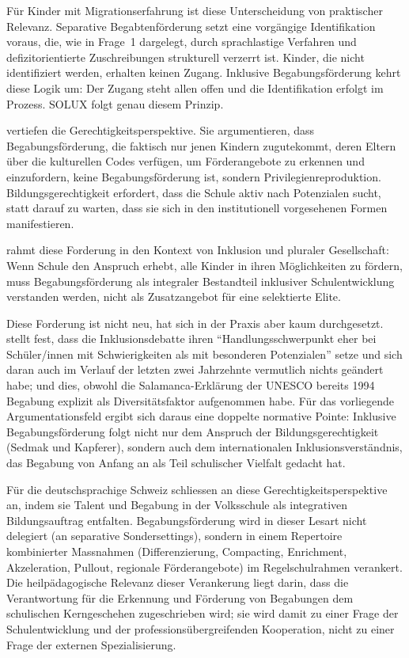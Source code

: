 \documentclass[ngerman, a4paper]{article}
\begin{document}
Für Kinder mit Migrationserfahrung ist diese Unterscheidung von praktischer
Relevanz. Separative Begabtenförderung setzt eine vorgängige Identifikation voraus,
die, wie in Frage~1 dargelegt, durch sprachlastige Verfahren und defizitorientierte
Zuschreibungen strukturell verzerrt ist. Kinder, die nicht identifiziert werden,
erhalten keinen Zugang. Inklusive Begabungsförderung kehrt diese Logik um: Der
Zugang steht allen offen und die Identifikation erfolgt im Prozess. SOLUX folgt
genau diesem Prinzip.

\textcite[S.\,65--76]{sedmak2021bildungsgerechtigkeit} vertiefen die Gerechtigkeitsperspektive. Sie argumentieren, dass
Begabungsförderung, die faktisch nur jenen Kindern zugutekommt, deren Eltern über
die kulturellen Codes verfügen, um Förderangebote zu erkennen und einzufordern, keine
Begabungsförderung ist, sondern Privilegienreproduktion. Bildungsgerechtigkeit
erfordert, dass die Schule aktiv nach Potenzialen sucht, statt darauf zu warten,
dass sie sich in den institutionell vorgesehenen Formen manifestieren.

\textcite[S.\,32--45]{muelleroppliger2021plurale} rahmt diese Forderung in den Kontext von Inklusion und pluraler
Gesellschaft: Wenn Schule den Anspruch erhebt, alle Kinder in ihren Möglichkeiten
zu fördern, muss Begabungsförderung als integraler Bestandteil inklusiver
Schulentwicklung verstanden werden, nicht als Zusatzangebot für eine selektierte
Elite.

Diese Forderung ist nicht neu, hat sich in der Praxis aber kaum durchgesetzt.
\textcite[S.\,119]{baudson2021wasdenken} stellt fest, dass die Inklusionsdebatte
ihren \enquote{Handlungsschwerpunkt eher bei Schüler/innen mit Schwierigkeiten als
  mit besonderen Potenzialen} setze und sich daran auch im Verlauf der letzten zwei
Jahrzehnte vermutlich nichts geändert habe; und dies, obwohl die
Salamanca-Erklärung der UNESCO bereits 1994 Begabung explizit als
Diversitätsfaktor aufgenommen habe. Für
das vorliegende Argumentationsfeld ergibt sich daraus eine doppelte normative
Pointe: Inklusive Begabungsförderung folgt nicht nur dem Anspruch der
Bildungsgerechtigkeit (Sedmak und Kapferer), sondern auch dem internationalen
Inklusionsverständnis, das Begabung von Anfang an als Teil schulischer Vielfalt
gedacht hat.

Für die deutschsprachige Schweiz schliessen
\textcite[S.\,317--325]{grossenbacher2014integrative} an diese
Gerechtigkeitsperspektive an, indem sie Talent und Begabung in der Volksschule
als integrativen Bildungsauftrag entfalten. Begabungsförderung wird in dieser
Lesart nicht delegiert (an separative Sondersettings), sondern in einem
Repertoire kombinierter Massnahmen (Differenzierung, Compacting, Enrichment,
Akzeleration, Pullout, regionale Förderangebote) im Regelschulrahmen verankert.
Die heilpädagogische Relevanz dieser Verankerung liegt darin, dass die
Verantwortung für die Erkennung und Förderung von Begabungen dem schulischen
Kerngeschehen zugeschrieben wird; sie wird damit zu einer Frage der
Schulentwicklung und der professionsübergreifenden Kooperation, nicht zu einer
Frage der externen Spezialisierung.
\end{document}
